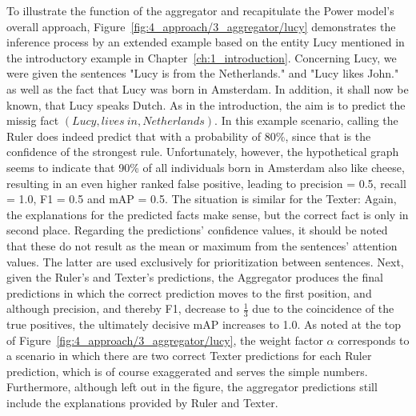 To illustrate the function of the aggregator and recapitulate the Power model's overall approach, Figure~\ref{fig:4_approach/3_aggregator/lucy} demonstrates the inference process by an extended example based on the entity Lucy mentioned in the introductory example in Chapter~\ref{ch:1_introduction}. Concerning Lucy, we were given the sentences "Lucy is from the Netherlands." and "Lucy likes John." as well as the fact that Lucy was born in Amsterdam. In addition, it shall now be known, that Lucy speaks Dutch. As in the introduction, the aim is to predict the missig fact $(Lucy, lives~in, Netherlands)$. In this example scenario, calling the Ruler does indeed predict that with a probability of 80\%, since that is the confidence of the strongest rule. Unfortunately, however, the hypothetical graph seems to indicate that 90\% of all individuals born in Amsterdam also like cheese, resulting in an even higher ranked false positive, leading to precision = 0.5, recall = 1.0, F1 = 0.5 and mAP = 0.5. The situation is similar for the Texter: Again, the explanations for the predicted facts make sense, but the correct fact is only in second place. Regarding the predictions' confidence values, it should be noted that these do not result as the mean or maximum from the sentences' attention values. The latter are used exclusively for prioritization between sentences. Next, given the Ruler's and Texter's predictions, the Aggregator produces the final predictions in which the correct prediction moves to the first position, and although precision, and thereby F1, decrease to $\frac{1}{3}$ due to the coincidence of the true positives, the ultimately decisive mAP increases to 1.0. As noted at the top of Figure~\ref{fig:4_approach/3_aggregator/lucy}, the weight factor $\alpha$ corresponds to a scenario in which there are two correct Texter predictions for each Ruler prediction, which is of course exaggerated and serves the simple numbers. Furthermore, although left out in the figure, the aggregator predictions still include the explanations provided by Ruler and Texter.

